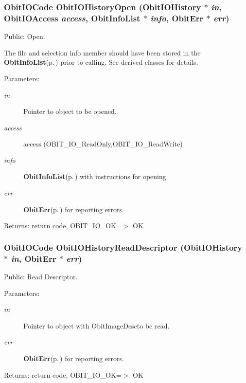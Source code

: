 \subsubsection{\setlength{\rightskip}{0pt plus 5cm}Obit\-IOCode Obit\-IOHistory\-Open ({\bf Obit\-IOHistory} $\ast$ {\em in}, Obit\-IOAccess {\em access}, {\bf Obit\-Info\-List} $\ast$ {\em info}, {\bf Obit\-Err} $\ast$ {\em err})}\label{ObitIOHistory_8c_a11}


Public: Open. 

The file and selection info member should have been stored in the {\bf Obit\-Info\-List}{\rm (p.\,\pageref{structObitInfoList})} prior to calling. See derived classes for details. \begin{Desc}
\item[Parameters:]
\begin{description}
\item[{\em in}]Pointer to object to be opened. \item[{\em access}]access (OBIT\_\-IO\_\-Read\-Only,OBIT\_\-IO\_\-Read\-Write) \item[{\em info}]{\bf Obit\-Info\-List}{\rm (p.\,\pageref{structObitInfoList})} with instructions for opening \item[{\em err}]{\bf Obit\-Err}{\rm (p.\,\pageref{structObitErr})} for reporting errors. \end{description}
\end{Desc}
\begin{Desc}
\item[Returns:]return code, OBIT\_\-IO\_\-OK=$>$ OK \end{Desc}
\subsubsection{\setlength{\rightskip}{0pt plus 5cm}Obit\-IOCode Obit\-IOHistory\-Read\-Descriptor ({\bf Obit\-IOHistory} $\ast$ {\em in}, {\bf Obit\-Err} $\ast$ {\em err})}\label{ObitIOHistory_8c_a17}


Public: Read Descriptor. 

\begin{Desc}
\item[Parameters:]
\begin{description}
\item[{\em in}]Pointer to object with Obit\-Image\-Descto be read. \item[{\em err}]{\bf Obit\-Err}{\rm (p.\,\pageref{structObitErr})} for reporting errors. \end{description}
\end{Desc}
\begin{Desc}
\item[Returns:]return code, OBIT\_\-IO\_\-OK=$>$ OK \end{Desc}

